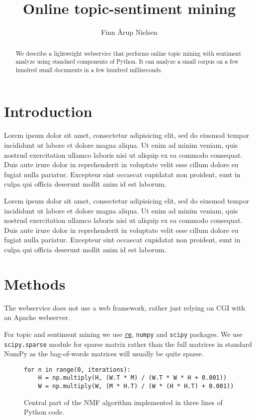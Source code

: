 \documentclass[10pt]{IEEEtran}
\title{Online topic-sentiment mining}
\author{Finn Årup Nielsen}
\begin{document}
\maketitle

\begin{abstract}
We describe a lightweight webservice that performs online topic mining
with sentiment analyze using standard components of Python.
It can analyze a small corpus on a few hundred small documents in a
few hundred milliseconds.
\end{abstract}

\section{Introduction}

Lorem ipsum dolor sit amet, consectetur adipisicing elit, sed do
eiusmod tempor incididunt ut labore et dolore magna aliqua. Ut enim ad
minim veniam, quis nostrud exercitation ullamco laboris nisi ut
aliquip ex ea commodo consequat. Duis aute irure dolor in
reprehenderit in voluptate velit esse cillum dolore eu fugiat nulla
pariatur. Excepteur sint occaecat cupidatat non proident, sunt in
culpa qui officia deserunt mollit anim id est laborum. 

Lorem ipsum dolor sit amet, consectetur adipisicing elit, sed do
eiusmod tempor incididunt ut labore et dolore magna aliqua. Ut enim ad
minim veniam, quis nostrud exercitation ullamco laboris nisi ut
aliquip ex ea commodo consequat. Duis aute irure dolor in
reprehenderit in voluptate velit esse cillum dolore eu fugiat nulla
pariatur. Excepteur sint occaecat cupidatat non proident, sunt in
culpa qui officia deserunt mollit anim id est laborum.


\section{Methods}

The webservice does not use a web framework, rather just relying on
CGI with an Apache webserver. 

For topic and sentiment mining we use
\href{http://docs.python.org/library/re.html}{\tt re}, {\tt numpy} and
{\tt scipy} packages.
We use {\tt scipy.sparse} module for sparse matrix rather than the
full matrices in standard NumPy as the bag-of-words matrices will
usually be quite sparse.

\begin{figure*}[t]
  \centering
\begin{verbatim}
for n in range(0, iterations): 
    H = np.multiply(H, (W.T * M) / (W.T * W * H + 0.001))
    W = np.multiply(W, (M * H.T) / (W * (H * H.T) + 0.001))
\end{verbatim}
  \caption{Central part of the NMF algorithm implemented in three
    lines of Python code.}
  \label{fig:nmf}
\end{figure*}
\end{document}
